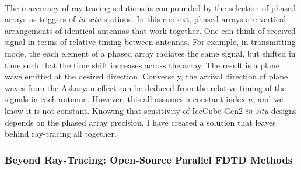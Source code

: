\documentclass[../../../main.tex]{subfiles}
\begin{document}
\\
\vspace{0.25cm}
The inaccuracy of ray-tracing solutions is compounded by the selection of phased arrays as triggers of \textit{in situ} stations.  In this context, phased-arrays are vertical arrangements of identical antennas that work together.  One can think of received signal in terms of relative timing between antennas.  For example, in transmitting mode, the each element of a phased array radiates the same signal, but shifted in time such that the time shift increases across the array.  The result is a plane wave emitted at the desired direction.  Conversely, the arrival direction of plane waves from the Askaryan effect can be deduced from the relative timing of the signals in each antenna. However, this all assumes a constant index $n$, and we know it is not constant.  Knowing that sensitivity of IceCube Gen2 \textit{in situ} designs depends on the phased array precision, I have created a solution that leaves behind ray-tracing all together.

\subsubsection{Beyond Ray-Tracing: Open-Source Parallel FDTD Methods}
\label{sec:cem_cluster}
\end{document}
